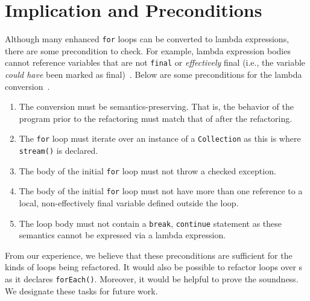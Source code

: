 \section{Implication and Preconditions}

Although many enhanced \lstinline{for} loops can be converted to lambda
expressions, there are some precondition to check. For example, lambda
expression bodies cannot reference variables that are not \lstinline{final} or
\emph{effectively} final (i.e., the variable \emph{could have} been marked as
final)~\cite{gosling2014java}.  Below are some preconditions for the lambda
conversion~\cite{gyori2013}. 

\begin{enumerate}

    \item The conversion must be semantics-preserving. That is, the behavior
        of the program prior to the refactoring must match that of after the
        refactoring.

    \item The \lstinline{for} loop must iterate over an instance of a
        \lstinline{Collection} as this is where \lstinline{stream()} is
        declared.

    \item The body of the initial \lstinline{for} loop must not throw a
        checked exception. 

    \item The body of the initial \lstinline{for} loop must not have more than
        one reference to a local, non-effectively final variable defined
        outside the loop.

    \item The loop body must not contain a \lstinline{break},
        \lstinline{continue} statement as these semantics cannot be expressed
        via a lambda expression.  

\end{enumerate}

From our experience, we believe that these preconditions are sufficient for
the kinds of loops being refactored. It would also be possible to refactor
loops over {\footnotesize{}}s as it declares
\lstinline{forEach()}.  Moreover, it would be helpful to prove the soundness.
We designate these tasks for future work.
